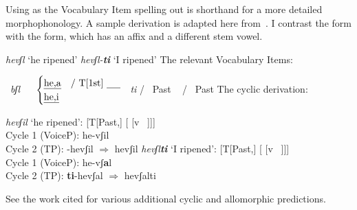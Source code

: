 \begin{exe}
\begin{xlist}
\begin{xlist}
\begin{exe}
\begin{exe}
\begin{xlist}
\begin{exe}
\begin{xlist}
\begin{exe}
\begin{xlist}
\begin{xlist}
\begin{exe}
\begin{xlist}
\begin{exe}
\begin{xlist}
\begin{exe}
\begin{exe}
\begin{exe}
\begin{xlist}
\begin{exe}
\begin{exe}
\begin{xlist}
\begin{xlist}
\begin{exe}
\begin{xlist}
\begin{exe}
\begin{exe}
\begin{exe}
\begin{xlist}
\begin{exe}
Using {\thif} as the Vocabulary Item spelling out {\vd} is shorthand for a more detailed morphophonology. A sample derivation is adapted here from~\cite{kastner18nllt}. I contrast the  form with the  form, which has an affix and a different stem vowel.
 \begin{exe}
 \ex  
 \begin{xlist} 
 	\ex  \emph{hevʃl} `he ripened' 
 	\ex  \emph{hevʃl-\textbf{ti}} `I ripened' 
 \z
\z 
The relevant Vocabulary Items:
 \begin{exe}
 \ex  
 \begin{xlist} 
 	\ex  {} \lra~\emph{bʃl} 
 	\ex  	\vd~\lra~ $\begin{cases} 
			\text{\emph{he,a}} & \text{/ T[1st] \trace}\\
			\text{\emph{he,i}}
			\end{cases}$\label{r1:4:4}
 	 \lra~\emph{ti} / \trace~Past 
 	\ex  {} \lra~{\zero} / \trace~Past 
 \z
\z 
The cyclic derivation:
 \begin{exe}
 \ex  
 \begin{xlist} 
 	\ex  \emph{hevʃil} `he ripened': [T[Past,] [{\vd} [v ~\!]]] \\
	Cycle 1 (VoiceP): he-vʃil\\
	Cycle 2 (TP): {\zero}-hevʃil $\Rightarrow$ hevʃil
 	\ex  \emph{hevʃl\textbf{ti}} `I ripened': [T[Past,] [{\vd} [v ~\!]]]  \\
	Cycle 1 (VoiceP): he-vʃ\textbf{a}l\\
	Cycle 2 (TP): \textbf{ti}-hevʃal $\Rightarrow$ hevʃalti
 \z
\z 	

See the work cited for various additional cyclic and allomorphic predictions.



\end{xlist}
\end{exe}
\end{xlist}
\end{exe}
\end{xlist}
\end{exe}
\end{exe}
\end{xlist}
\end{exe}
\end{exe}
\end{exe}
\end{xlist}
\end{exe}
\end{xlist}
\end{xlist}
\end{exe}
\end{exe}
\end{xlist}
\end{exe}
\end{exe}
\end{exe}
\end{xlist}
\end{exe}
\end{xlist}
\end{exe}
\end{xlist}
\end{xlist}
\end{exe}
\end{xlist}
\end{exe}
\end{xlist}
\end{exe}
\end{exe}
\end{xlist}
\end{xlist}
\end{exe}
